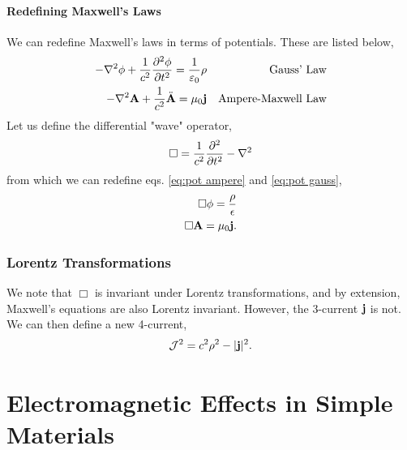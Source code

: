 \documentclass{book}
\begin{document}
\subsubsection{Redefining Maxwell's Laws}
We can redefine Maxwell's laws in terms of potentials. These are listed below,
\begin{align}
	-\laplacian\phi + \frac{1}{c^2}\pdv[2]{\phi}{t} = \frac{1}{\varepsilon_0}\rho && \text{Gauss' Law} \label{eq:pot gauss} \\
	-\laplacian\vb{A} + \frac{1}{c^2}\Ddot{\vb{A}} = \mu_0 \vb{j} && \text{Ampere-Maxwell Law} \label{eq:pot ampere}
\end{align}
Let us define the differential "wave" operator,
\begin{equation}
	\Box = \frac{1}{c^2}\pdv[2]{t} - \laplacian
\end{equation}
from which we can redefine eqs. \eqref{eq:pot ampere} and \eqref{eq:pot gauss},
\begin{align}
	\Box \phi = \frac{\rho}{\epsilon} \\
	\Box \vb{A} = \mu_0\vb{j}.
\end{align}
\subsection{Lorentz Transformations}
We note that $\Box$ is invariant under Lorentz transformations, and by extension, Maxwell's equations are also Lorentz invariant. However, the 3-current $\vb{j}$ is not. We can then define a new 4-current,
\begin{equation}
	\mathcal{J}^2 = c^2\rho^2 - |\vb{j}|^2.
\end{equation}
\chapter{Electromagnetic Effects in Simple Materials}
\end{document}

